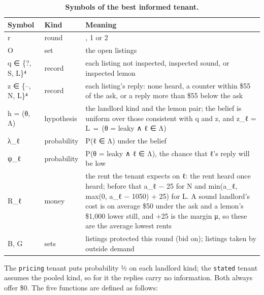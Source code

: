 \renewcommand{\thetable}{C.1}
\begin{longtable}[]{@{}
  >{\raggedright\arraybackslash}p{}
  >{\raggedright\arraybackslash}p{}
  >{\raggedright\arraybackslash}p{}@{}}
\caption{\textbf{Symbols of the best informed tenant.}}\label{tab:C.1}\tabularnewline
\toprule\noalign{}
\begin{minipage}[b]{\linewidth}\raggedright
Symbol
\end{minipage} & \begin{minipage}[b]{\linewidth}\raggedright
Kind
\end{minipage} & \begin{minipage}[b]{\linewidth}\raggedright
Meaning
\end{minipage} \\
\midrule\noalign{}
\endhead
\bottomrule\noalign{}
\endlastfoot
r & round & 0, 1 or 2 \\
O & set & the open listings \\
q ∈ \{?, S, L\}⁴ & record & each listing not inspected, inspected sound, or inspected lemon \\
z ∈ \{--, N, L\}⁴ & record & each listing's reply: none heard, a counter within \$55 of the ask, or a reply more than \$55 below the ask \\
h = (θ, Λ) & hypothesis & the landlord kind and the lemon pair; the belief is uniform over those consistent with q and z, and z\_ℓ = L ⇔ (θ = leaky ∧ ℓ ∈ Λ) \\
λ\_ℓ & probability & P(ℓ ∈ Λ) under the belief \\
ψ\_ℓ & probability & P(θ = leaky ∧ ℓ ∈ Λ), the chance that ℓ's reply will be low \\
R\_ℓ & money & the rent the tenant expects on ℓ: the rent heard once heard; before that a\_ℓ − 25 for N and min(a\_ℓ, max(0, a\_ℓ − 1050) + 25) for L. A sound landlord's cost is on average \$50 under the ask and a lemon's \$1,000 lower still, and +25 is the margin μ, so these are the average lowest rents \\
B, G & sets & listings protected this round (bid on); listings taken by outside demand \\
\end{longtable}

The \texttt{pricing} tenant puts probability ½ on each landlord kind; the \texttt{stated} tenant assumes the pooled kind, so for
it the replies carry no information. Both always offer \$0. The five functions are defined as follows:

